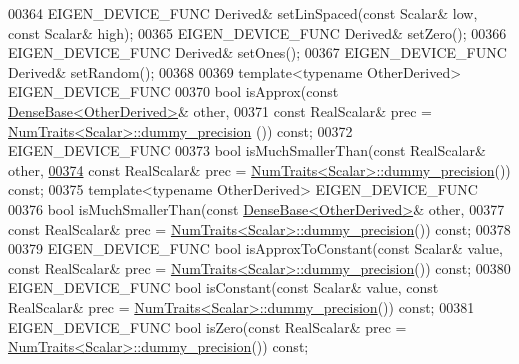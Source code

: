 \begin{DoxyCode}
00364     EIGEN\_DEVICE\_FUNC Derived& setLinSpaced(\textcolor{keyword}{const} Scalar& low, \textcolor{keyword}{const} Scalar& high);
00365     EIGEN\_DEVICE\_FUNC Derived& setZero();
00366     EIGEN\_DEVICE\_FUNC Derived& setOnes();
00367     EIGEN\_DEVICE\_FUNC Derived& setRandom();
00368 
00369     \textcolor{keyword}{template}<\textcolor{keyword}{typename} OtherDerived> EIGEN\_DEVICE\_FUNC
00370     \textcolor{keywordtype}{bool} isApprox(\textcolor{keyword}{const} \hyperlink{group___core___module_class_eigen_1_1_dense_base}{DenseBase<OtherDerived>}& other,
00371                   \textcolor{keyword}{const} RealScalar& prec = \hyperlink{group___core___module_struct_eigen_1_1_num_traits}{NumTraits<Scalar>::dummy\_precision}
      ()) \textcolor{keyword}{const};
00372     EIGEN\_DEVICE\_FUNC 
00373     \textcolor{keywordtype}{bool} isMuchSmallerThan(\textcolor{keyword}{const} RealScalar& other,
\hyperlink{group___core___module_a35eade54f5223ddb652c2057ab26b94c}{00374}                            \textcolor{keyword}{const} RealScalar& prec = 
      \hyperlink{group___core___module_struct_eigen_1_1_num_traits}{NumTraits<Scalar>::dummy\_precision}()) \textcolor{keyword}{const};
00375     \textcolor{keyword}{template}<\textcolor{keyword}{typename} OtherDerived> EIGEN\_DEVICE\_FUNC
00376     \textcolor{keywordtype}{bool} isMuchSmallerThan(\textcolor{keyword}{const} \hyperlink{group___core___module_class_eigen_1_1_dense_base}{DenseBase<OtherDerived>}& other,
00377                            \textcolor{keyword}{const} RealScalar& prec = 
      \hyperlink{group___core___module_struct_eigen_1_1_num_traits}{NumTraits<Scalar>::dummy\_precision}()) \textcolor{keyword}{const};
00378 
00379     EIGEN\_DEVICE\_FUNC \textcolor{keywordtype}{bool} isApproxToConstant(\textcolor{keyword}{const} Scalar& value, \textcolor{keyword}{const} RealScalar& prec = 
      \hyperlink{group___core___module_struct_eigen_1_1_num_traits}{NumTraits<Scalar>::dummy\_precision}()) \textcolor{keyword}{const};
00380     EIGEN\_DEVICE\_FUNC \textcolor{keywordtype}{bool} isConstant(\textcolor{keyword}{const} Scalar& value, \textcolor{keyword}{const} RealScalar& prec = 
      \hyperlink{group___core___module_struct_eigen_1_1_num_traits}{NumTraits<Scalar>::dummy\_precision}()) \textcolor{keyword}{const};
00381     EIGEN\_DEVICE\_FUNC \textcolor{keywordtype}{bool} isZero(\textcolor{keyword}{const} RealScalar& prec = 
      \hyperlink{group___core___module_struct_eigen_1_1_num_traits}{NumTraits<Scalar>::dummy\_precision}()) \textcolor{keyword}{const};

\end{DoxyCode}
